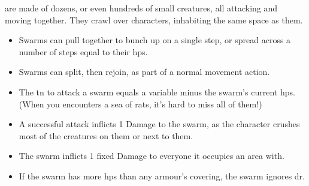 \iftoggle{examplecharacter}{}{Swarms} are made of dozens, or even hundreds of small creatures, all attacking and moving together.
They crawl over characters, inhabiting the same space as them.

\begin{itemize}
  \item
  Swarms can pull together to bunch up on a single \gls{step}, or spread across a number of \glspl{step} equal to their \glspl{hp}.
  \item
  Swarms can split, then rejoin, as part of a normal movement action.
  \item
  The \gls{tn} to attack a swarm equals a variable minus the swarm's current \glspl{hp}.
  (When you encounters a sea of rats, it's hard to miss all of them!)
  \item
  A successful attack inflicts 1 Damage to the swarm, as the character crushes most of the creatures on them or next to them.
  \item
  The swarm inflicts 1 fixed Damage to everyone it occupies an area with.
  \item
  If the swarm has more \glspl{hp} than any armour's \gls{covering}, the swarm ignores \gls{dr}.
\end{itemize}

